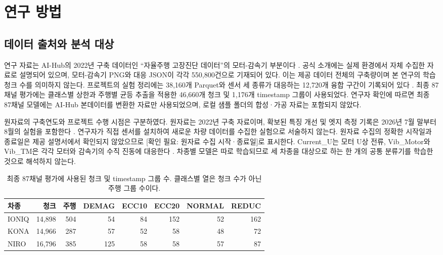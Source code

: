 \documentclass[11pt,a4paper]{article}
\newcommand{\checkneeded}[1]{\textcolor{red!65!black}{[확인 필요: #1]}}
\newcommand{\sourceproject}{\citep{project2026}}
\begin{document}
\section{연구 방법}
\subsection{데이터 출처와 분석 대상}
연구 자료는 AI-Hub의 2022년 구축 데이터인 ``자율주행 고장진단 데이터''의 모터-감속기 부분이다 \citep{aihub2022}.
공식 소개에는 실제 환경에서 자체 수집한 자료로 설명되어 있으며, 모터-감속기 PNG와 대응 JSON이 각각 550,800건으로 기재되어 있다.
이는 제공 데이터 전체의 구축량이며 본 연구의 학습 청크 수를 의미하지 않는다.
프로젝트의 실험 정리에는 38,160개 Parquet와 센서 세 종류가 대응하는 12,720개 융합 구간이 기록되어 있다 \sourceproject.
최종 87채널 평가에는 클래스별 상한과 주행별 균등 추출을 적용한 46,660개 청크 및 1,176개 timestamp 그룹이 사용되었다.
연구자 확인에 따르면 최종 87채널 모델에는 AI-Hub 본데이터를 변환한 자료만 사용되었으며, 로컬 샘플 폴더의 합성·가공 자료는 포함되지 않았다.

원자료의 구축연도와 프로젝트 수행 시점은 구분하였다.
원자료는 2022년 구축 자료이며, 확보된 특징 개선 및 엣지 측정 기록은 2026년 7월 말부터 8월의 실험을 포함한다 \sourceproject.
연구자가 직접 센서를 설치하여 새로운 차량 데이터를 수집한 실험으로 서술하지 않는다.
원자료 수집의 정확한 시작일과 종료일은 제공 설명서에서 확인되지 않았으므로 \checkneeded{원자료 수집 시작·종료일}로 표시한다.
Current\_U는 모터 U상 전류, Vib\_Motor와 Vib\_TM은 각각 모터와 감속기의 수직 진동에 대응한다 \citep{aihub2022}.
차종별 모델은 따로 학습되므로 세 차종을 대상으로 하는 한 개의 공통 분류기를 학습한 것으로 해석하지 않는다.

\begin{table}[htbp]
\centering
\caption{최종 87채널 평가에 사용된 청크 및 timestamp 그룹 수. 클래스별 열은 청크 수가 아닌 주행 그룹 수이다.}
\label{tab:samples}
\begingroup\small\setlength{\tabcolsep}{5pt}
\begin{tabular}{lrrrrrrr}
\toprule
차종 & 청크 & 주행 & DEMAG & ECC10 & ECC20 & NORMAL & REDUC \\
\midrule
IONIQ & 14,898 & 504 & 54 & 84 & 152 & 52 & 162 \\
KONA & 14,966 & 287 & 57 & 52 & 58 & 48 & 72 \\
NIRO & 16,796 & 385 & 125 & 58 & 58 & 57 & 87 \\
\bottomrule
\end{tabular}
\endgroup
\end{table}
\end{document}
